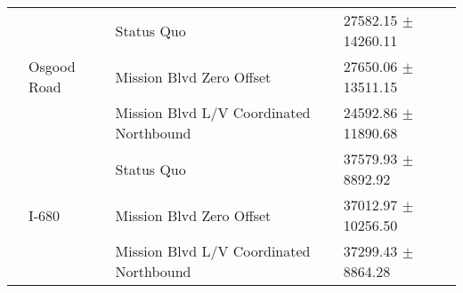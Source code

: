 \begin{table}
\begin{tabular}{llll}
 & \multirow[t]{3}{*}{Osgood Road} & Status Quo & 27582.15 $\pm$ 14260.11 \\
 &  & Mission Blvd Zero Offset & 27650.06 $\pm$ 13511.15 \\
 &  & Mission Blvd L/V Coordinated Northbound & 24592.86 $\pm$ 11890.68 \\
 & \multirow[t]{3}{*}{I-680} & Status Quo & 37579.93 $\pm$ 8892.92 \\
 &  & Mission Blvd Zero Offset & 37012.97 $\pm$ 10256.50 \\
 &  & Mission Blvd L/V Coordinated Northbound & 37299.43 $\pm$ 8864.28 \\
\bottomrule
\end{tabular}
\end{table}
